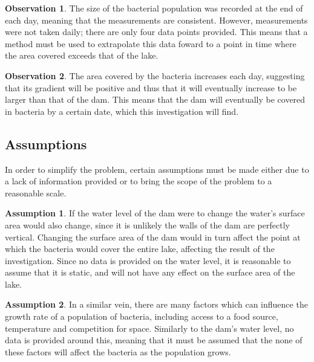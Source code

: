 \documentclass[a4paper]{article}
\theoremstyle{definition}
\newtheorem{assumption}{Assumption}
\newtheorem{observation}{Observation}
\begin{document}
        \begin{observation}
            The size of the bacterial population was recorded at the end of each day, meaning that the measurements are consistent. However, measurements were not taken daily; there are only four data points provided. This means that a method must be used to extrapolate this data foward to a point in time where the area covered exceeds that of the lake.
        \end{observation}

        \begin{observation}
            The area covered by the bacteria increases each day, suggesting that its gradient will be positive and thus that it will eventually increase to be larger than that of the dam. This means that the dam will eventually be covered in bacteria by a certain date, which this investigation will find.
        \end{observation}
    
    \subsection{Assumptions}
    
        In order to simplify the problem, certain assumptions must be made either due to a lack of information provided or to bring the scope of the problem to a reasonable scale.

        \begin{assumption}
            If the water level of the dam were to change the water's surface area would also change, since it is unlikely the walls of the dam are perfectly vertical. Changing the surface area of the dam would in turn affect the point at which the bacteria would cover the entire lake, affecting the result of the investigation. Since no data is provided on the water level, it is reasonable to assume that it is static, and will not have any effect on the surface area of the lake.
        \end{assumption}

        \begin{assumption} \label{asmptnBacteriaGrowth}
            In a similar vein, there are many factors which can influence the growth rate of a population of bacteria, including access to a food source, temperature and competition for space. Similarly to the dam's water level, no data is provided around this, meaning that it must be assumed that the none of these factors will affect the bacteria as the population grows.
        \end{assumption}
        
\end{document}
